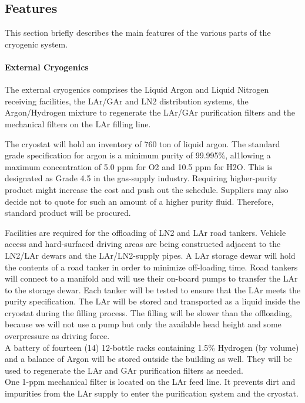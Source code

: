 \subsection{Features}

This section briefly describes the main features of the various parts of the cryogenic system.

\paragraph{External Cryogenics}

The external cryogenics comprises the Liquid Argon and Liquid Nitrogen receiving facilities, the LAr/GAr and LN2 distribution systems, the Argon/Hydrogen mixture to regenerate the LAr/GAr purification filters and the mechanical filters on the LAr filling line.

The cryostat will hold an inventory of 760 ton of liquid argon. The standard grade specification for argon is a minimum purity of 99.995\%, al1lowing a maximum concentration of 5.0 ppm for O2 and 10.5 ppm for H2O. This is designated as Grade 4.5 in the gas-supply industry. Requiring higher-purity product might increase the cost and push out the schedule. Suppliers may also decide not to quote for such an amount of a higher purity fluid. Therefore, standard product will be procured.

Facilities are required for the offloading of LN2 and LAr road tankers. Vehicle access and hard-surfaced driving areas are being constructed adjacent to the LN2/LAr dewars and the LAr/LN2-supply pipes. A LAr storage dewar will hold the contents of a road tanker in order to minimize off-loading time. Road tankers will connect to a manifold and will use their on-board pumps to transfer the LAr to the storage dewar. Each tanker will be tested to ensure that the LAr meets the purity specification. The LAr will be stored and transported as a liquid inside the cryostat during the filling process. The filling will be slower than the offloading, because we will not use a pump but only the available head height and some overpressure as driving force. \\
%
A battery of fourteen (14) 12-bottle racks containing 1.5\% Hydrogen (by volume) and a balance of Argon will be stored outside the building as well. They will be used to regenerate the LAr and GAr purification filters as needed.\\
%
One 1-ppm mechanical filter is located on the LAr feed line. It prevents dirt and impurities from the LAr supply to enter the purification system and the cryostat.

